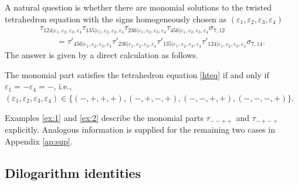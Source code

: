 A natural question is whether there are monomial solutions to the twisted tetrahedron equation
with the signs homogeneously chosen as $(\varepsilon_1,\varepsilon_2,\varepsilon_3,\varepsilon_4)$
\begin{gather}
\tau_{124| \varepsilon_1,\varepsilon_2,\varepsilon_3,\varepsilon_4}
\tau_{135| \varepsilon_1,\varepsilon_2,\varepsilon_3,\varepsilon_4}
\tau_{236| \varepsilon_1,\varepsilon_2,\varepsilon_3,\varepsilon_4}
\tau_{456| \varepsilon_1,\varepsilon_2,\varepsilon_3,\varepsilon_4} \sigma_{7,12}\nonumber
\\
\qquad=
\tau'_{456| \varepsilon_1,\varepsilon_2,\varepsilon_3,\varepsilon_4}
\tau'_{236| \varepsilon_1,\varepsilon_2,\varepsilon_3,\varepsilon_4}
\tau'_{135| \varepsilon_1,\varepsilon_2,\varepsilon_3,\varepsilon_4}
\tau'_{124| \varepsilon_1,\varepsilon_2,\varepsilon_3,\varepsilon_4}\sigma_{7,14}.\label{hteq}
\end{gather}
The answer is given by a direct calculation as follows.
\begin{Proposition} \label{pr:mono}
The monomial part
satisfies the tetrahedron equation \eqref{hteq}
if and only if~${\varepsilon_1=-\varepsilon_4 = -}$, i.e.,
$(\varepsilon_1,\varepsilon_2,\varepsilon_3,\varepsilon_4) \in
\{(-,+,+,+), (-,+,-,+), (-,-,+,+), (-,-,-,+)\}$.
\end{Proposition}
Examples \ref{ex:1} and \ref{ex:2} describe the monomial parts
$\tau_{--++}$ and $\tau_{-+-+}$ explicitly.
Analogous information is supplied for the remaining two cases in Appendix \ref{ap:sup}.

\subsection{Dilogarithm identities}\label{ss:did}

